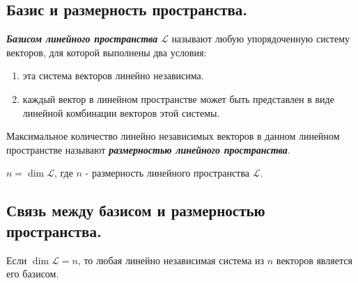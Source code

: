 \newpage


\subsection{
    Базис и размерность пространства.
}

\begin{definition}
    \textbf{\textit{Базисом линейного пространства}} $\mathcal{L}$ называют любую упорядоченную систему векторов, для которой выполнены два условия:
    \begin{enumerate}[nosep]
        \item эта система векторов линейно независима.
        \item каждый вектор в линейном пространстве может быть представлен в виде линейной комбинации векторов этой системы.
    \end{enumerate}
\end{definition}

\begin{definition}
    Максимальное количество линейно независимых векторов в данном линейном пространстве называют \textbf{\textit{размерностью линейного пространства}}.
\end{definition}

\begin{designation}
    $n = \dim \mathcal{L}$, где $n$ - размерность линейного пространства $\mathcal{L}$.
\end{designation}


\newpage


\subsection{
    Связь между базисом и размерностью пространства.
}

\begin{theorem}
    Если $\dim \mathcal{L} = n$, то любая линейно независимая система из $n$ векторов является его базисом.
    \label{thm:theorem_2_1}
\end{theorem}

